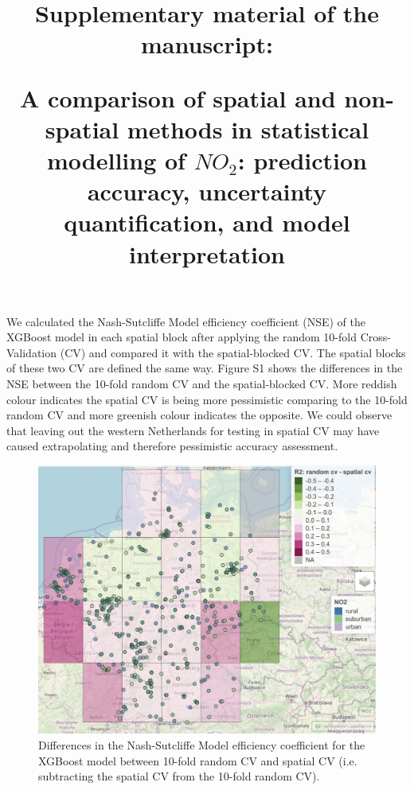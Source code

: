 \documentclass{article}
\title{Supplementary material of the manuscript:
 
 A comparison of spatial and non-spatial methods in statistical modelling of $NO_2$: prediction accuracy, uncertainty quantification, and model interpretation}
\date{}
\author{}
\begin{document}
\maketitle
We calculated the Nash-Sutcliffe Model efficiency coefficient (NSE) of the XGBoost model in each spatial block after applying the random 10-fold Cross-Validation (CV) and compared it with the spatial-blocked CV. The spatial blocks of these two CV are defined the same way. Figure S1 shows the differences in the NSE between the 10-fold random CV and the spatial-blocked CV. More reddish colour indicates the spatial CV is being more pessimistic comparing to the 10-fold random CV and more greenish colour indicates the opposite. We could observe that leaving out the western Netherlands for testing in spatial CV may have caused extrapolating and therefore pessimistic accuracy assessment.  

\begin{figure}
    \centering
    \includegraphics[scale=0.2]{s1.jpeg}
    \caption{Differences in the Nash-Sutcliffe Model efficiency coefficient for the XGBoost model between 10-fold random CV and spatial CV (i.e. subtracting the spatial CV from the 10-fold random CV). 
}
    \label{fig:histqq}
\end{figure}{}
\end{document}
